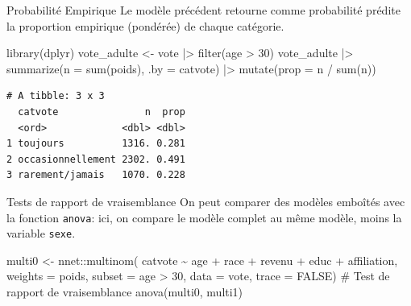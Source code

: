 \documentclass[
  ignorenonframetext,
]{beamer}
\newenvironment{Shaded}{\begin{snugshade}}{\end{snugshade}}
\newcommand{\AttributeTok}[1]{\textcolor[rgb]{0.40,0.45,0.13}{#1}}
\newcommand{\CommentTok}[1]{\textcolor[rgb]{0.37,0.37,0.37}{#1}}
\newcommand{\ConstantTok}[1]{\textcolor[rgb]{0.56,0.35,0.01}{#1}}
\newcommand{\DecValTok}[1]{\textcolor[rgb]{0.68,0.00,0.00}{#1}}
\newcommand{\FunctionTok}[1]{\textcolor[rgb]{0.28,0.35,0.67}{#1}}
\newcommand{\NormalTok}[1]{\textcolor[rgb]{0.00,0.23,0.31}{#1}}
\newcommand{\OtherTok}[1]{\textcolor[rgb]{0.00,0.23,0.31}{#1}}
\newcommand{\SpecialCharTok}[1]{\textcolor[rgb]{0.37,0.37,0.37}{#1}}
\begin{document}
\begin{frame}[fragile]{Probabilité Empirique}
\label{probabilituxe9-empirique}
Le modèle précédent retourne comme probabilité prédite la proportion
empirique (pondérée) de chaque catégorie.

\begin{Shaded}
\begin{Highlighting}[numbers=left,,]
\FunctionTok{library}\NormalTok{(dplyr)}
\NormalTok{vote\_adulte }\OtherTok{\textless{}{-}}\NormalTok{ vote }\SpecialCharTok{|\textgreater{}}  \FunctionTok{filter}\NormalTok{(age }\SpecialCharTok{\textgreater{}} \DecValTok{30}\NormalTok{)}
\NormalTok{vote\_adulte }\SpecialCharTok{|\textgreater{}} 
  \FunctionTok{summarize}\NormalTok{(}\AttributeTok{n =} \FunctionTok{sum}\NormalTok{(poids), }\AttributeTok{.by =}\NormalTok{ catvote) }\SpecialCharTok{|\textgreater{}}
  \FunctionTok{mutate}\NormalTok{(}\AttributeTok{prop =}\NormalTok{ n }\SpecialCharTok{/} \FunctionTok{sum}\NormalTok{(n))}
\end{Highlighting}
\end{Shaded}

\begin{verbatim}
# A tibble: 3 x 3
  catvote               n  prop
  <ord>             <dbl> <dbl>
1 toujours          1316. 0.281
2 occasionnellement 2302. 0.491
3 rarement/jamais   1070. 0.228
\end{verbatim}
\end{frame}

\begin{frame}[fragile]{Tests de rapport de vraisemblance}
\label{tests-de-rapport-de-vraisemblance}
On peut comparer des modèles emboîtés avec la fonction \texttt{anova}:
ici, on compare le modèle complet au même modèle, moins la variable
\texttt{sexe}.

\begin{Shaded}
\begin{Highlighting}[numbers=left,,]
\NormalTok{multi0 }\OtherTok{\textless{}{-}}\NormalTok{ nnet}\SpecialCharTok{::}\FunctionTok{multinom}\NormalTok{(}
\NormalTok{  catvote }\SpecialCharTok{\textasciitilde{}}\NormalTok{ age }\SpecialCharTok{+}\NormalTok{ race }\SpecialCharTok{+}\NormalTok{ revenu }\SpecialCharTok{+}\NormalTok{ educ }\SpecialCharTok{+}\NormalTok{ affiliation,}
  \AttributeTok{weights =}\NormalTok{ poids,}
  \AttributeTok{subset =}\NormalTok{ age }\SpecialCharTok{\textgreater{}} \DecValTok{30}\NormalTok{,}
  \AttributeTok{data =}\NormalTok{ vote,}
  \AttributeTok{trace =} \ConstantTok{FALSE}\NormalTok{)}
\CommentTok{\# Test de rapport de vraisemblance}
\FunctionTok{anova}\NormalTok{(multi0, multi1)}
\end{Highlighting}
\end{Shaded}
\end{frame}
\end{document}

